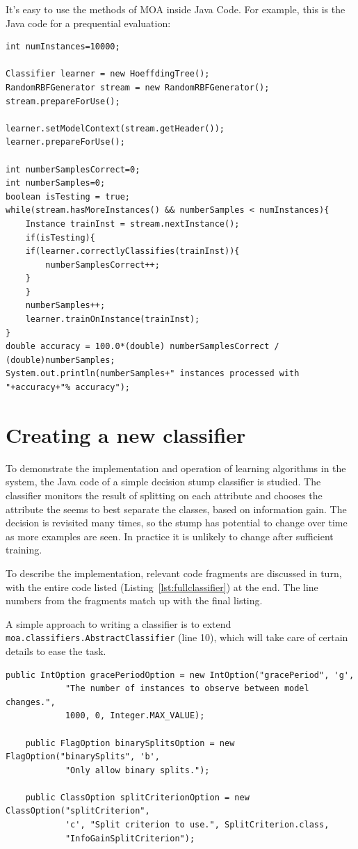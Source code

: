 \documentclass[a4paper,12pt,twoside]{book}
\begin{document}
It's easy to use the methods of MOA inside Java Code. For example, this is the Java code for a prequential evaluation:

\begin{lstlisting}[caption={Java Code Example},label=lst:fullclassifier]
int numInstances=10000;

Classifier learner = new HoeffdingTree();
RandomRBFGenerator stream = new RandomRBFGenerator();
stream.prepareForUse();

learner.setModelContext(stream.getHeader());
learner.prepareForUse();

int numberSamplesCorrect=0;
int numberSamples=0;
boolean isTesting = true;
while(stream.hasMoreInstances() && numberSamples < numInstances){
    Instance trainInst = stream.nextInstance();
    if(isTesting){
	if(learner.correctlyClassifies(trainInst)){
	    numberSamplesCorrect++;
	}
    }
    numberSamples++;
    learner.trainOnInstance(trainInst);
}
double accuracy = 100.0*(double) numberSamplesCorrect / (double)numberSamples;
System.out.println(numberSamples+" instances processed with "+accuracy+"% accuracy");
\end{lstlisting}


\section{Creating a new classifier}

To demonstrate the implementation and operation of learning algorithms in the system, the Java code of a simple decision stump classifier is studied. The classifier monitors the result of splitting on each attribute and chooses the attribute the seems to best separate the classes, based on information gain. The decision is revisited many times, so the stump has potential to change over time as more examples are seen. In practice it is unlikely to change after sufficient training.

To describe the implementation, relevant code fragments are discussed in turn, with the entire code listed (Listing~\ref{lst:fullclassifier}) at the end. The line numbers from the fragments match up with the final listing.

A simple approach to writing a classifier is to extend  \\ \verb+moa.classifiers.AbstractClassifier+ (line 10), which will take care of certain details to ease the task.

\begin{lstlisting}[caption={Option handling},label=lst:opthandle,firstnumber=14]
	public IntOption gracePeriodOption = new IntOption("gracePeriod", 'g',
			"The number of instances to observe between model changes.",
			1000, 0, Integer.MAX_VALUE);

	public FlagOption binarySplitsOption = new FlagOption("binarySplits", 'b',
			"Only allow binary splits.");

	public ClassOption splitCriterionOption = new ClassOption("splitCriterion",
			'c', "Split criterion to use.", SplitCriterion.class,
			"InfoGainSplitCriterion");
\end{lstlisting}
\end{document}
